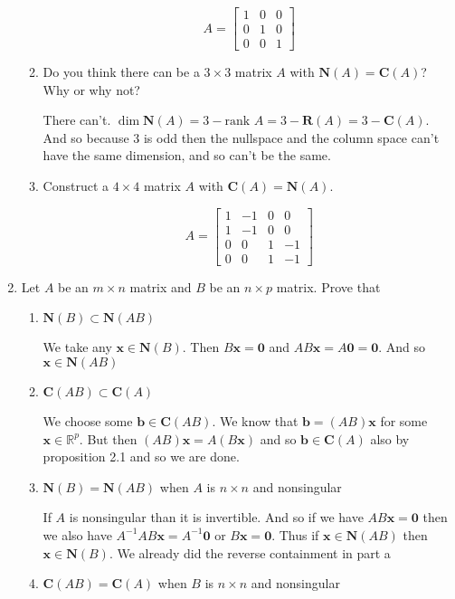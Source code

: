 \documentclass[letterpaper]{article}
\begin{document}
\begin{enumerate}
\begin{enumerate}
  \[A=\left[\begin{array}{ccc}1&0&0\\0&1&0\\0&0&1\end{array}\right]\]
  \item
  Do you think there can be a $3\times 3$ matrix $A$ with $\mathbf{N}(A)=\mathbf{C}(A)$? Why or why not?
  
  There can't. $\dim \mathbf{N}(A)=3-\text{rank } A=3-\mathbf{R}(A)=3-\mathbf{C}(A)$. And so because $3$ is odd then the nullspace and the column space can't have the same dimension, and so can't be the same.
  \item
  Construct a $4\times 4$ matrix $A$ with $\mathbf{C}(A)=\mathbf{N}(A)$.

  \[A=\left[\begin{array}{rrrr}1&-1&0&0\\1&-1&0&0\\0&0&1&-1\\0&0&1&-1\end{array}\right]\]
  \end{enumerate}
\setcounter{enumi}{9}
\item
Let $A$ be an $m\times n$ matrix and $B$ be an $n\times p$ matrix. Prove that
  \begin{enumerate}
  \item
  $\mathbf{N}(B)\subset\mathbf{N}(AB)$

  We take any $\mathbf{x}\in \mathbf{N}(B)$. Then $B\mathbf{x}=\mathbf{0}$ and $AB\mathbf{x}=A\mathbf{0}=\mathbf{0}$. And so $\mathbf{x}\in \mathbf{N}(AB)$

  \item
  $\mathbf{C}(AB)\subset\mathbf{C}(A)$

  We choose some $\mathbf{b}\in \mathbf{C}(AB)$. We know that $\mathbf{b}=(AB)\mathbf{x}$ for some $\mathbf{x}\in \mathbb{R}^p$. But then $(AB)\mathbf{x}=A(B\mathbf{x})$ and so $\mathbf{b}\in \mathbf{C}(A)$ also by proposition 2.1 and so we are done.
  \item
  $\mathbf{N}(B)=\mathbf{N}(AB)$ when $A$ is $n\times n$ and nonsingular

  If $A$ is nonsingular than it is invertible. And so if we have $AB\mathbf{x}=\mathbf{0}$ then we also have $A^{-1}AB\mathbf{x}=A^{-1}\mathbf{0}$ or $B\mathbf{x}=\mathbf{0}$. Thus if $\mathbf{x}\in \mathbf{N}(AB)$ then $\mathbf{x}\in \mathbf{N}(B)$. We already did the reverse containment in part a
  \item
  $\mathbf{C}(AB)=\mathbf{C}(A)$ when $B$ is $n\times n$ and nonsingular


\end{enumerate}
\end{enumerate}
\end{document}

